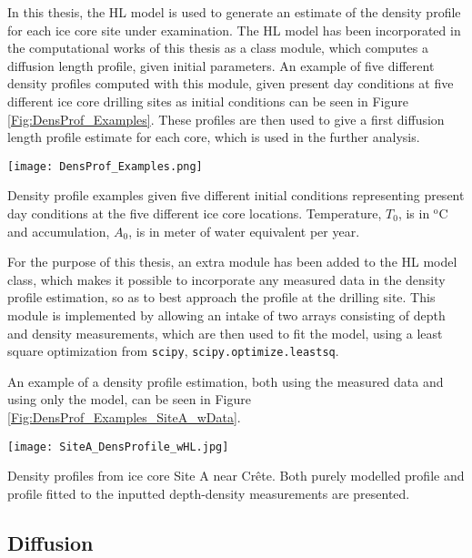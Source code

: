 \documentclass[../../CompleteThesis2/Complete_2ndDraft]{subfiles}
\begin{document}
In this thesis, the HL model is used to generate an estimate of the density profile for each ice core site under examination. The HL model has been incorporated in the computational works of this thesis as a class module, which computes a diffusion length profile, given initial parameters. An example of five different density profiles computed with this module, given present day conditions at five different ice core drilling sites as initial conditions can be seen in Figure \ref{Fig:DensProf_Examples}. These profiles are then used to give a first diffusion length profile estimate for each core, which is used in the further analysis. 

\begin{marginfigure}
	\centering
	\texttt{[image: DensProf\_Examples.png]}
	\caption[Five theoretical density profile examples.]{\footnotesize Density profile examples given five different initial conditions representing present day conditions at the five different ice core locations. Temperature, $T_0$, is in $^{\text{o}}$C and accumulation, $A_0$, is in meter of water equivalent per year.}
	\label{Fig:DensProf_Examples}
\end{marginfigure}


For the purpose of this thesis, an extra module has been added to the HL model class, which makes it possible to incorporate any measured data in the density profile estimation, so as to best approach the profile at the drilling site. This module is implemented by allowing an intake of two arrays consisting of depth and density measurements, which are then used to fit the model, using a least square optimization from \lstinline[language=python]|scipy|, \lstinline[language=python]|scipy.optimize.leastsq|.

An example of a density profile estimation, both using the measured data and using only the model, can be seen in Figure \ref{Fig:DensProf_Examples_SiteA_wData}.

\begin{marginfigure}
	\centering
	\texttt{[image: SiteA\_DensProfile\_wHL.jpg]}
	\caption[Site A density profile, data and theory.]{\footnotesize Density profiles from ice core Site A near Crête. Both purely modelled profile and profile fitted to the inputted depth-density measurements are presented.}
	\label{Fig:DensProf_Examples_SiteA_wData}
\end{marginfigure}

\subsection[Diffusion]{Diffusion}
\label{Subsec:Ice_DiffusionAndDensification_Diffusion}
\end{document}
